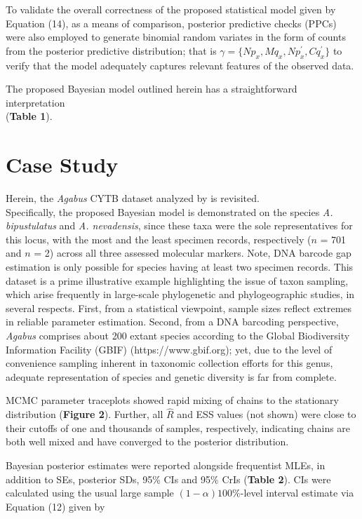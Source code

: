 \documentclass[12pt]{article}
\begin{document}
To validate the overall correctness of the proposed statistical model given by Equation (14), as a means of comparison, posterior predictive checks (PPCs) were also employed to generate binomial random variates in the form of counts from the posterior predictive distribution; that is $\gamma = \{Np_x, Mq_x, Np^{'}_x, Cq^{'}_x\}$ to verify that the model adequately captures relevant features of the observed data. 

The proposed Bayesian model outlined herein has a straightforward interpretation \\ (\textbf{Table 1}). 

\section{Case Study}

Herein, the \textit{Agabus} CYTB dataset analyzed by \citet{phillips2024measure} is revisited. \\ Specifically, the proposed Bayesian model is demonstrated on the species \textit{A. bipustulatus} and \textit{A. nevadensis}, since these taxa were the sole representatives for this locus, with the most and the least specimen records, respectively ($n$ = 701 and $n$ = 2) across all three assessed molecular markers. Note, DNA barcode gap estimation is only possible for species having at least two specimen records. This dataset is a prime illustrative example highlighting the issue of taxon sampling, which arise frequently in large-scale phylogenetic and phylogeographic studies, in several respects. First, from a statistical viewpoint, sample sizes reflect extremes in reliable parameter estimation. Second, from a DNA barcoding perspective, \textit{Agabus} comprises about 200 extant species according to the Global Biodiversity Information Facility (GBIF) (https://www.gbif.org); yet, due to the level of convenience sampling inherent in taxonomic collection efforts for this genus, adequate representation of species and genetic diversity is far from complete. 

MCMC parameter traceplots showed rapid mixing of chains to the stationary distribution (\textbf{Figure 2}). Further, all $\hat{R}$ and ESS values (not shown) were close to their cutoffs of one and thousands of samples, respectively, indicating chains are both well mixed and have converged to the posterior distribution.  

Bayesian posterior estimates were reported alongside frequentist MLEs, in addition to SEs, posterior SDs, 95\% CIs and 95\% CrIs (\textbf{Table 2}). CIs were calculated using the usual large sample  $(1-\alpha)100\%$-level interval estimate via Equation (12) given by
\end{document}
